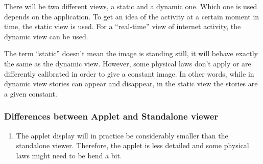 There will be two different views, a static and a dynamic one. Which one is
used depends on the application. To get an idea of the activity at a certain
moment in time, the static view is used. For a ``real-time'' view of internet
activity, the dynamic view can be used.

The term ``static'' doesn't mean the image is standing still, it will behave
exactly the same as the dynamic view. However, some physical laws don't apply
or are differently calibrated in order to give a constant image. In other
words, while in dynamic view stories can appear and disappear, in the static
view the stories are a given constant.

\subsubsection{Differences between Applet and Standalone viewer}

\begin{enumerate}
  \item The applet display will in practice be considerably smaller than the
        standalone viewer. Therefore, the applet is less detailed and some
        physical laws might need to be bend a bit.
\end{enumerate}

